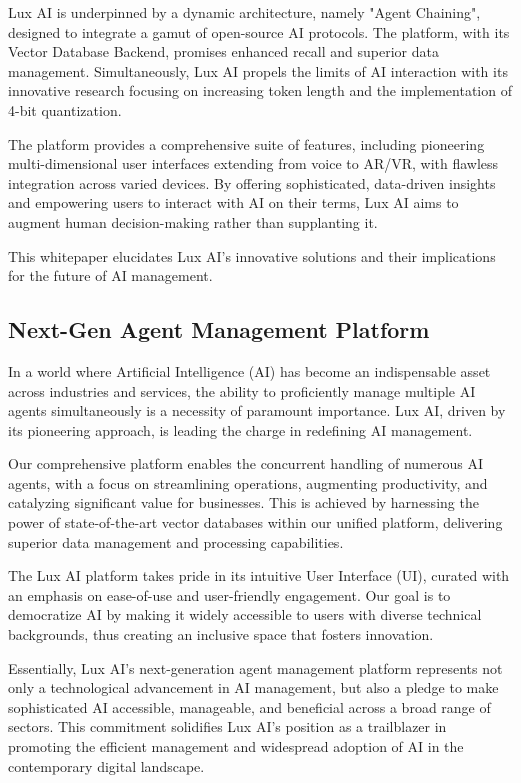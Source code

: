 \documentclass[11pt]{article}
\begin{document}
Lux AI is underpinned by a dynamic architecture, namely "Agent Chaining", designed to integrate a gamut of open-source AI protocols. The platform, with its Vector Database Backend, promises enhanced recall and superior data management. Simultaneously, Lux AI propels the limits of AI interaction with its innovative research focusing on increasing token length and the implementation of 4-bit quantization.


The platform provides a comprehensive suite of features, including pioneering multi-dimensional user interfaces extending from voice to AR/VR, with flawless integration across varied devices. By offering sophisticated, data-driven insights and empowering users to interact with AI on their terms, Lux AI aims to augment human decision-making rather than supplanting it.


This whitepaper elucidates Lux AI's innovative solutions and their implications for the future of AI management.


\subsection{Next-Gen Agent Management Platform}

In a world where Artificial Intelligence (AI) has become an indispensable asset across industries and services, the ability to proficiently manage multiple AI agents simultaneously is a necessity of paramount importance. Lux AI, driven by its pioneering approach, is leading the charge in redefining AI management.


Our comprehensive platform enables the concurrent handling of numerous AI agents, with a focus on streamlining operations, augmenting productivity, and catalyzing significant value for businesses. This is achieved by harnessing the power of state-of-the-art vector databases within our unified platform, delivering superior data management and processing capabilities.


The Lux AI platform takes pride in its intuitive User Interface (UI), curated with an emphasis on ease-of-use and user-friendly engagement. Our goal is to democratize AI by making it widely accessible to users with diverse technical backgrounds, thus creating an inclusive space that fosters innovation.


Essentially, Lux AI's next-generation agent management platform represents not only a technological advancement in AI management, but also a pledge to make sophisticated AI accessible, manageable, and beneficial across a broad range of sectors. This commitment solidifies Lux AI's position as a trailblazer in promoting the efficient management and widespread adoption of AI in the contemporary digital landscape.
\end{document}
